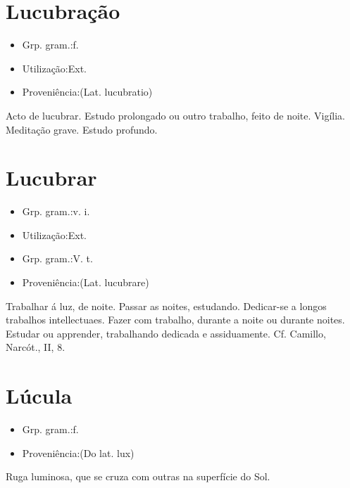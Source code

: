 \section{Lucubração}
\begin{itemize}
\item {Grp. gram.:f.}
\end{itemize}
\begin{itemize}
\item {Utilização:Ext.}
\end{itemize}
\begin{itemize}
\item {Proveniência:(Lat. \textunderscore lucubratio\textunderscore )}
\end{itemize}
Acto de lucubrar.
Estudo prolongado ou outro trabalho, feito de noite.
Vigília.
Meditação grave.
Estudo profundo.
\section{Lucubrar}
\begin{itemize}
\item {Grp. gram.:v. i.}
\end{itemize}
\begin{itemize}
\item {Utilização:Ext.}
\end{itemize}
\begin{itemize}
\item {Grp. gram.:V. t.}
\end{itemize}
\begin{itemize}
\item {Proveniência:(Lat. \textunderscore lucubrare\textunderscore )}
\end{itemize}
Trabalhar á luz, de noite.
Passar as noites, estudando.
Dedicar-se a longos trabalhos intellectuaes.
Fazer com trabalho, durante a noite ou durante noites.
Estudar ou apprender, trabalhando dedicada e assiduamente. Cf. Camillo, \textunderscore Narcót.\textunderscore , II, 8.
\section{Lúcula}
\begin{itemize}
\item {Grp. gram.:f.}
\end{itemize}
\begin{itemize}
\item {Proveniência:(Do lat. \textunderscore lux\textunderscore )}
\end{itemize}
Ruga luminosa, que se cruza com outras na superfície do Sol.
